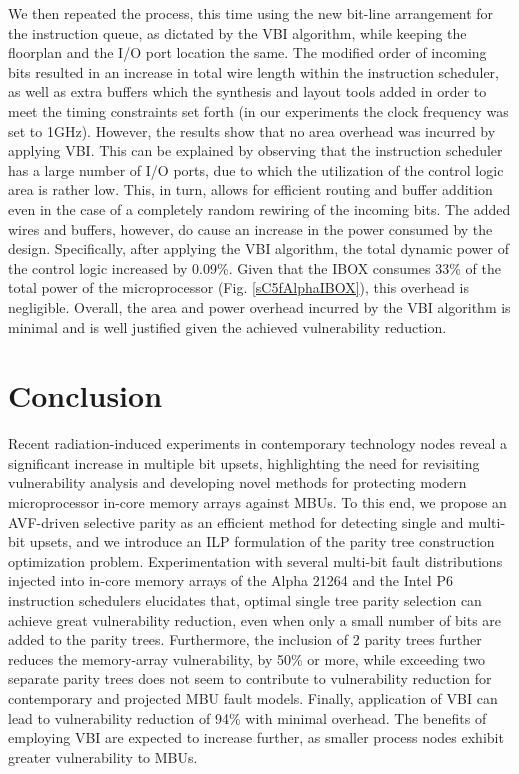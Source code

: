 \documentclass[12pt]{yalephd}
\begin{document}
We then repeated the process, this time using the new bit-line arrangement for the instruction queue, as dictated by the VBI algorithm, while keeping the floorplan and the I/O port location the same. The modified order of incoming bits resulted in an increase in total wire length within the instruction scheduler, as well as extra buffers which the synthesis and layout tools added in order to meet the timing constraints set forth (in our experiments the clock frequency was set to 1GHz). However, the results show that no area overhead was incurred by applying VBI. This can be explained by observing that the instruction scheduler has a large number of I/O ports, due to which the utilization of the control logic area is rather low. This, in turn, allows for efficient routing and buffer addition even in the case of a completely random rewiring of the incoming bits. The added wires and buffers, however, do cause an increase in the power consumed by the design. Specifically, after applying the VBI algorithm, the total dynamic power of the control logic increased by 0.09\%. Given that the IBOX consumes 33\% of the total power of the microprocessor (Fig. \ref{sC5fAlphaIBOX}), this overhead is negligible. Overall, the area and power overhead incurred by the VBI algorithm is minimal and is well justified given the achieved vulnerability reduction.

\section{Conclusion}\label{sC5sConclusion}

Recent radiation-induced experiments in contemporary technology nodes reveal a significant increase in multiple bit upsets, highlighting the need for revisiting vulnerability analysis and developing novel methods for protecting modern microprocessor in-core memory arrays against MBUs. To this end, we propose an AVF-driven selective parity as an efficient method for detecting single and multi- bit upsets, and we introduce an ILP formulation of the parity tree construction optimization problem. Experimentation with several multi-bit fault distributions injected into in-core memory arrays of the Alpha 21264 and the Intel P6 instruction schedulers elucidates that, optimal single tree parity selection can achieve great vulnerability reduction, even when only a small number of bits are added to the parity trees. Furthermore, the inclusion of 2 parity trees further reduces the memory-array vulnerability, by 50\% or more, while exceeding two separate parity trees does not seem to contribute to vulnerability reduction for contemporary and projected MBU fault models. Finally, application of VBI can lead to vulnerability reduction of 94\% with minimal overhead. The benefits of employing VBI are expected to increase further, as smaller process nodes exhibit greater vulnerability to MBUs.
\end{document}
